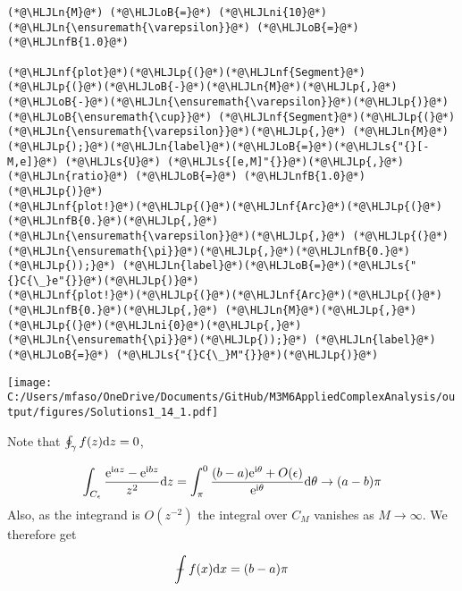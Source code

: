 \documentclass[12pt,landscape]{article}
\newcommand{\HLJLn}[1]{#1}
\newcommand{\HLJLnf}[1]{\textcolor[RGB]{66,102,213}{#1}}
\newcommand{\HLJLs}[1]{\textcolor[RGB]{201,61,57}{#1}}
\newcommand{\HLJLnfB}[1]{\textcolor[RGB]{59,151,46}{#1}}
\newcommand{\HLJLni}[1]{\textcolor[RGB]{59,151,46}{#1}}
\newcommand{\HLJLoB}[1]{\textcolor[RGB]{102,102,102}{\textbf{#1}}}
\newcommand{\HLJLp}[1]{#1}
\def\D{ {\rm d} }
\def\I{ {\rm i} }
\def\E{ {\rm e} }
\def\Xint#1{ \mathchoice
   {\XXint\displaystyle\textstyle{#1} }%
   {\XXint\textstyle\scriptstyle{#1} }%
   {\XXint\scriptstyle\scriptscriptstyle{#1} }%
   {\XXint\scriptscriptstyle\scriptscriptstyle{#1} }%
   \!\int}
\def\XXint#1#2#3{ {\setbox0=\hbox{$#1{#2#3}{\int}$}
     \vcenter{\hbox{$#2#3$}}\kern-.5\wd0} }
\def\dashint{\Xint-}
\def\dx{\D x}
\def\dz{\D z}
\def\cent#1{\begin{center}#1\end{center} }
\begin{document}
{\begin{lstlisting}
(*@\HLJLn{M}@*) (*@\HLJLoB{=}@*) (*@\HLJLni{10}@*)
(*@\HLJLn{\ensuremath{\varepsilon}}@*) (*@\HLJLoB{=}@*) (*@\HLJLnfB{1.0}@*)

(*@\HLJLnf{plot}@*)(*@\HLJLp{(}@*)(*@\HLJLnf{Segment}@*)(*@\HLJLp{(}@*)(*@\HLJLoB{-}@*)(*@\HLJLn{M}@*)(*@\HLJLp{,}@*) (*@\HLJLoB{-}@*)(*@\HLJLn{\ensuremath{\varepsilon}}@*)(*@\HLJLp{)}@*) (*@\HLJLoB{\ensuremath{\cup}}@*) (*@\HLJLnf{Segment}@*)(*@\HLJLp{(}@*)(*@\HLJLn{\ensuremath{\varepsilon}}@*)(*@\HLJLp{,}@*) (*@\HLJLn{M}@*)(*@\HLJLp{);}@*)(*@\HLJLn{label}@*)(*@\HLJLoB{=}@*)(*@\HLJLs{"{}[-M,e]}@*) (*@\HLJLs{U}@*) (*@\HLJLs{[e,M]"{}}@*)(*@\HLJLp{,}@*) (*@\HLJLn{ratio}@*) (*@\HLJLoB{=}@*) (*@\HLJLnfB{1.0}@*)(*@\HLJLp{)}@*)
(*@\HLJLnf{plot!}@*)(*@\HLJLp{(}@*)(*@\HLJLnf{Arc}@*)(*@\HLJLp{(}@*)(*@\HLJLnfB{0.}@*)(*@\HLJLp{,}@*)(*@\HLJLn{\ensuremath{\varepsilon}}@*)(*@\HLJLp{,}@*) (*@\HLJLp{(}@*)(*@\HLJLn{\ensuremath{\pi}}@*)(*@\HLJLp{,}@*)(*@\HLJLnfB{0.}@*)(*@\HLJLp{));}@*) (*@\HLJLn{label}@*)(*@\HLJLoB{=}@*)(*@\HLJLs{"{}C{\_}e"{}}@*)(*@\HLJLp{)}@*)
(*@\HLJLnf{plot!}@*)(*@\HLJLp{(}@*)(*@\HLJLnf{Arc}@*)(*@\HLJLp{(}@*)(*@\HLJLnfB{0.}@*)(*@\HLJLp{,}@*) (*@\HLJLn{M}@*)(*@\HLJLp{,}@*) (*@\HLJLp{(}@*)(*@\HLJLni{0}@*)(*@\HLJLp{,}@*)(*@\HLJLn{\ensuremath{\pi}}@*)(*@\HLJLp{));}@*) (*@\HLJLn{label}@*) (*@\HLJLoB{=}@*) (*@\HLJLs{"{}C{\_}M"{}}@*)(*@\HLJLp{)}@*)
\end{lstlisting}

\cent{\texttt{[image: C:/Users/mfaso/OneDrive/Documents/GitHub/M3M6AppliedComplexAnalysis/output/figures/Solutions1\_14\_1.pdf]}}

Note that $\oint_\gamma f(z) \dz = 0$,

\[
\int_{C_\epsilon} {\E^{\I a z } - \E^{\I b z} \over z^2} \dz =
 \int_\pi^0 { (b-a) \E^{\I \theta}  + O(\epsilon) \over \E^{ \I \theta}} \D\theta \rightarrow (a-b) \pi
\]
Also, as the integrand is $O(z^{-2})$ the integral over $C_M$ vanishes as $M \rightarrow \infty$. We therefore get

\[
    \dashint f(x)\dx = (b-a)\pi
\]

}
\end{document}
